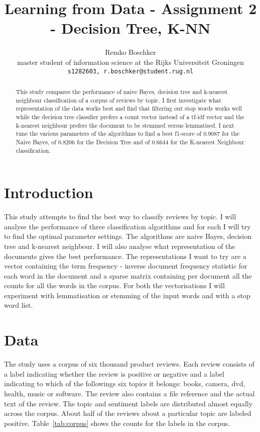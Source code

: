 \documentclass[11pt]{article}
\title{Learning from Data - Assignment 2 - Decision Tree, K-NN}
\author{Remko Boschker \\
  master student of information science at the Rijks Universiteit Groningen \\
  {\tt s1282603, r.boschker@student.rug.nl} }
\date{}
\begin{document}
\maketitle
\begin{abstract}
This study compares the performance of naive Bayes, decision tree and k-nearest neighbour classification of a corpus of reviews by topic. I first investigate what representation of the data works best and find that filtering out stop words works well while the decision tree classifier prefers a count vector instead of a tf-idf vector and the k-nearest neighbour prefers the document to be stemmed versus lemmatised. I next tune the various parameters of the algorithms to find a best f1-score of 0.9087 for the Naive Bayes, of 0.8206 for the Decision Tree and of 0.6644 for the K-nearest Neighbour classification.
\end{abstract}

\section{Introduction}

This study attempts to find the best way to classify reviews by topic. I will analyse the performance of three classification algorithms and for each I will try to find the optimal parameter settings. The algorithms are naive Bayes, decision tree and k-nearest neighbour. I will also analyse what representation of the documents gives the best performance. The representations I want to try are a vector containing the term frequency - inverse document frequency statistic for each word in the document and a sparse matrix containing per document all the counts for all the words in the corpus. For both the vectorisations I will experiment with lemmatisation or stemming of the input words and with a stop word list.

\section{Data}

The study uses a corpus of six thousand product reviews. Each review consists of a label indicating whether the review is positive or negative and a label indicating to which of the followings six topics it belongs: books, camera, dvd, health, music or software. The review also contains a file reference and the actual text of the review. The topic and sentiment labels are distributed almost equally across the corpus. About half of the reviews about a particular topic are labeled positive. Table~\ref{tab:corpus} shows the counts for the labels in the corpus.
\end{document}
